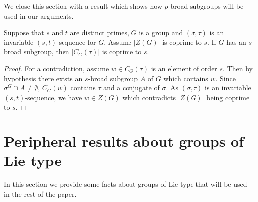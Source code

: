 \documentclass[12pt,a4paper]{amsart}
\begin{document}
We close this section with a result which shows how $p$-broad subgroups will be used in our arguments.

\begin{lemma}\label{lem: broad subgroups}
Suppose that $s$ and $t$ are distinct primes, $G$ is  a group and  $(\sigma,\tau)$ is an invariable $(s,t)$-sequence for $G$. Assume $|Z(G)|$ is coprime to $s$.  If $G$ has an $s$-broad subgroup, then $|C_G(\tau)|$ is coprime to $s$.
\end{lemma}

\begin{proof}  For a contradiction, assume $w\in C_G(\tau)$ is an   element of order $s$. Then by hypothesis there exists an $s$-broad subgroup $A$ of $G$ which contains $w$. Since $\sigma ^G\cap A \not=\emptyset$, $C_G(w)$ contains $\tau$ and a conjugate of $\sigma$. As  $(\sigma,\tau)$ is an invariable $(s,t)$-sequence, we have $w \in Z(G)$ which contradicts $|Z(G)|$ being coprime to $s$.
\end{proof}

\section{Peripheral  results about groups of Lie type}\label{sec:4}

In this section we provide some facts about groups of Lie type that will be used in the rest of the paper.
\end{document}
